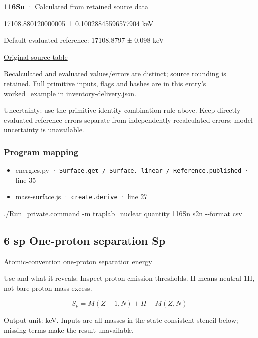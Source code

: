 \documentclass[
  11pt,
  letterpaper,
]{article}
\newenvironment{Shaded}{}{}
\newcommand{\AttributeTok}[1]{\textcolor[rgb]{0.49,0.56,0.16}{#1}}
\newcommand{\ExtensionTok}[1]{#1}
\newcommand{\NormalTok}[1]{#1}
\providecommand{\tightlist}{%
  \setlength{\itemsep}{0pt}\setlength{\parskip}{0pt}}
\begin{document}
\textbf{116Sn} · Calculated from retained source data

17108.880120000005 ± 0.10028845596577904 keV

Default evaluated reference: 17108.8797 ± 0.098 keV

\href{https://www-nds.iaea.org/amdc/ame2020/rct1.mas20.txt}{Original
source table}

Recalculated and evaluated values/errors are distinct; source rounding
is retained. Full primitive inputs, flags and hashes are in this entry's
worked\_example in inventory-delivery.json.

Uncertainty: use the primitive-identity combination rule above. Keep
directly evaluated reference errors separate from independently
recalculated errors; model uncertainty is unavailable.

\subsubsection{Program mapping}\label{program-mapping-4}

\begin{itemize}
\tightlist
\item
  energies.py ·
  \texttt{Surface.get\ /\ Surface.\_linear\ /\ Reference.published} ·
  line 35
\item
  mass-surface.js · \texttt{create.derive} · line 27
\end{itemize}

\begin{Shaded}
\begin{Highlighting}[]
\ExtensionTok{./Run\_private.command} \AttributeTok{{-}m}\NormalTok{ traplab\_nuclear quantity 116Sn s2n }\AttributeTok{{-}{-}format}\NormalTok{ csv}
\end{Highlighting}
\end{Shaded}

\subsection{6 sp One-proton separation
Sp}\label{sp-one-proton-separation-sp}

Atomic-convention one-proton separation energy

Use and what it reveals: Inspect proton-emission thresholds. H means
neutral 1H, not bare-proton mass excess.

\[
S_p=M(Z-1,N)+H-M(Z,N)
\]

Output unit: keV. Inputs are all masses in the state-consistent stencil
below; missing terms make the result unavailable.
\end{document}
